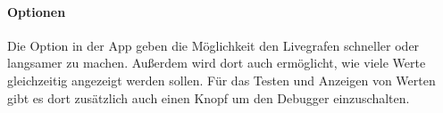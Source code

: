 	\paragraph{Optionen}
	Die Option in der App geben die Möglichkeit den Livegrafen schneller oder langsamer zu machen. Außerdem wird dort auch ermöglicht, wie viele Werte gleichzeitig angezeigt werden sollen. Für das Testen und Anzeigen von Werten gibt es dort zusätzlich auch einen Knopf um den Debugger einzuschalten.